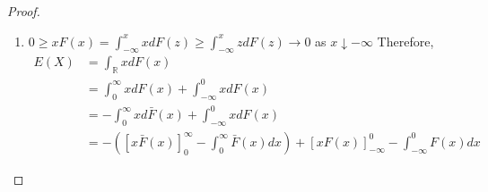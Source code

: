 \documentclass{article}
\newcommand{\R}{\mathbb{R}}
\begin{document}
\begin{myprop}{}{}
\begin{proof}
\begin{enumerate}
\begin{enumerate}[label=(\roman*)]
\begin{enumerate}[label=(\alph*)]
							\item $0\geq xF(x)=\int_{-\infty}^xxdF(z)\geq\int_{-\infty}^xzdF(z)\to0$ as $x\downarrow-\infty$ Therefore,
							\begin{align*}
								E(X)&=\int_{\R}xdF(x)\\
								&=\int_0^{\infty}xdF(x)+\int_{-\infty}^0xdF(x)\\
								&=-\int_0^{\infty}xd\bar{F}(x)+\int_{-\infty}^0xdF(x)\\
								&=-([x\bar{F}(x)]_0^{\infty}-\int_0^{\infty}\bar{F}(x)dx)+[xF(x)]_{-\infty}^0-\int_{-\infty}^0F(x)dx
							\end{align*}
						\end{enumerate}
					\end{enumerate}
				\end{enumerate}
			\end{proof}
		\end{myprop}
	
\end{document}
